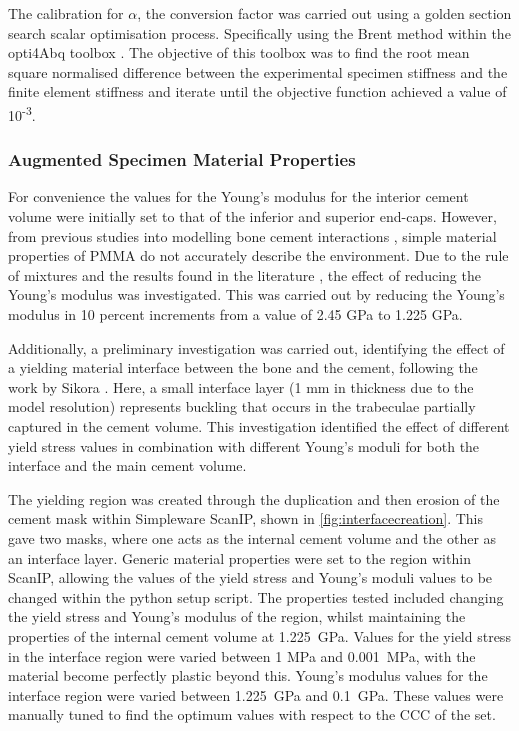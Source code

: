 The calibration for \(\alpha\), the conversion factor was carried out using a
golden section search scalar optimisation process. Specifically using the Brent
method within the opti4Abq toolbox \cite{Mengoni2017}. The
objective of this toolbox was to find the root mean square normalised
difference between the experimental specimen stiffness and the finite element
stiffness and iterate until the objective function achieved a value of
10\textsuperscript{-3}.

\subsubsection{Augmented Specimen Material
Properties}\label{augmented-specimen-material-properties}


For convenience the values for the Young's modulus for the interior cement
volume were initially set to that of the inferior and superior end-caps.
However, from previous studies into modelling bone cement interactions
\cite{Sikora2013a, Kinzl2012a, Kinzl2012, Chevalier2008, Wijayathunga2008,
Zhou2000, Tozzi2012, Janssen2008}, simple material properties of PMMA do not
accurately describe the environment.  Due to the rule of mixtures and the
results found in the literature \cite{Kinzl2012a,Race2007}, the effect of
reducing the Young's modulus was investigated. This was carried out by reducing
the Young's modulus in 10 percent increments from a value of 2.45 GPa to 1.225
GPa.

Additionally, a preliminary investigation was carried out, identifying the
effect of a yielding material interface between the bone and the cement,
following the work by Sikora \cite{Sikora2013a}.  Here, a small interface layer
(1 mm in thickness due to the model resolution) represents buckling that occurs
in the trabeculae partially captured in the cement volume.  This investigation
identified the effect of different yield stress values in combination with
different Young's moduli for both the interface and the main cement volume.

The yielding region was created through the duplication and then erosion of the
cement mask within Simpleware ScanIP, shown in \cref{fig:interfacecreation}.
This gave two masks, where one acts as the internal cement volume and the other
as an interface layer.  Generic material properties were set to the region
within ScanIP, allowing the values of the yield stress and Young's moduli
values to be changed within the python setup script.  The properties tested
included changing the yield stress and Young's modulus of the region, whilst
maintaining the properties of the internal cement volume at 1.225~GPa.  Values
for the yield stress in the interface region were varied between 1 MPa and
0.001~MPa, with the material become perfectly plastic beyond this.  Young's
modulus values for the interface region were varied between 1.225~GPa and
0.1~GPa. These values were manually tuned to find the optimum values with
respect to the CCC of the set.

